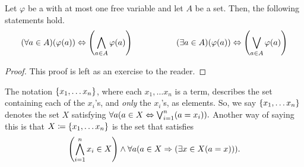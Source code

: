 \begin{theorem}
    Let \(\varphi\) be a {\wff} with at most one free variable and let \(A\) be a set.
    Then, the following statements hold.
    \[
        \pn*{\forall a \in A}\pn*{\varphi(a)} \iff \pn*{\bigmeet_{a \in A}\varphi(a)}
        ~~~~~~~~~~~~~~~~
        \pn*{\exists a \in A}\pn*{\varphi(a)} \iff \pn*{\bigjoin_{a \in A}\varphi(a)}
    \]
\end{theorem}
\begin{proof}
    This proof is left as an exercise to the reader.
\end{proof}
% 

\begin{definition}\label{not:setbuilder}
    The notation \(\set*{x_1, \dots x_n}\),
    where each \(x_1, \dots x_n\) is a term, 
    describes the set containing each of the \(x_i\)'s, and \emph{only} the \(x_i\)'s, as elements.
    So, we say \(\set*{x_1, \dots x_n}\) denotes the set \(X\) satisfying
    \(
        \forall a \pn*{a \in X \iff \bigjoin_{i = 1}^{n}\pn*{a = x_i}}.
    \)
    Another way of saying this is that \(X \defn \set*{x_1, \dots x_n}\) is the set that satisfies
    \[
        \pn*{\bigmeet_{i = 1}^{n}x_i \in X}
             \meet \forall a \pn*{a \in X \implies \pn*{\exists x \in X \pn*{a = x}}}.
    \]
\end{definition}

